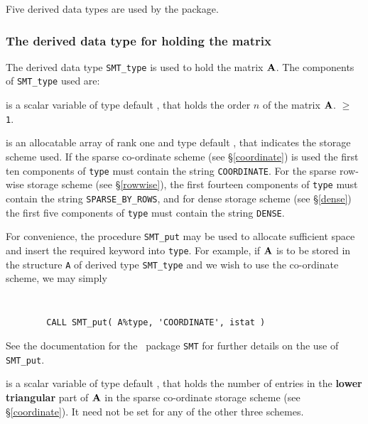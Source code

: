 \documentclass{galahad}
\begin{document}

\galtypes
Five derived data types are used by the package.


\subsubsection{The derived data type for holding the matrix}\label{typeprob}
The derived data type {\tt SMT\_type} is used to hold the matrix ${\mathbf{A}}$.
The components of {\tt SMT\_type} used are:

\begin{description}

 is a scalar variable of type default \integer, that holds
the order $n$ of the matrix  ${\mathbf{A}}$.
 $\geq$ {\tt 1}.

 is an allocatable array of rank one and type default \character, that
indicates the storage scheme used. If the
sparse co-ordinate scheme (see \S\ref{coordinate}) is used
the first ten components of {\tt type} must contain the
string {\tt COORDINATE}.
For the sparse row-wise storage scheme (see \S\ref{rowwise}),
the first fourteen components of {\tt type} must contain the
string {\tt SPARSE\_BY\_ROWS}, and
for dense storage scheme (see \S\ref{dense})
the first five components of {\tt type} must contain the
string {\tt DENSE}.

For convenience, the procedure {\tt SMT\_put}
may be used to allocate sufficient space and insert the required keyword
into {\tt type}.
For example, if ${\mathbf{A}}$ is to be stored in the structure {\tt A}
of derived type {\tt SMT\_type} and we wish to use
the co-ordinate scheme, we may simply
{\tt
\begin{verbatim}
        CALL SMT_put( A%type, 'COORDINATE', istat )
\end{verbatim}
}
\noindent
See the documentation for the \galahad\ package {\tt SMT}
for further details on the use of {\tt SMT\_put}.

 is a scalar variable of type default \integer, that
holds the number of entries in the {\bf lower triangular} part of ${\mathbf{A}}$
in the sparse co-ordinate storage scheme (see \S\ref{coordinate}).
It need not be set for any of the other three schemes.


\end{description}
\end{document}
